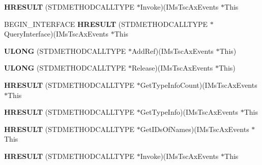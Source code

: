\begin{DoxyCompactItemize}
\item 
\mbox{\label{struct_i_ms_tsc_ax_events_vtbl_aa4c996f5b75ec11511423529ce78799d}} 
{\bfseries H\+R\+E\+S\+U\+LT} (S\+T\+D\+M\+E\+T\+H\+O\+D\+C\+A\+L\+L\+T\+Y\+PE $\ast$Invoke)(I\+Ms\+Tsc\+Ax\+Events $\ast$This
\item 
\mbox{\label{struct_i_ms_tsc_ax_events_vtbl_a735a32525d4f7fcb8f51600a5813d290}} 
B\+E\+G\+I\+N\+\_\+\+I\+N\+T\+E\+R\+F\+A\+CE {\bfseries H\+R\+E\+S\+U\+LT} (S\+T\+D\+M\+E\+T\+H\+O\+D\+C\+A\+L\+L\+T\+Y\+PE $\ast$Query\+Interface)(I\+Ms\+Tsc\+Ax\+Events $\ast$This
\item 
\mbox{\label{struct_i_ms_tsc_ax_events_vtbl_aa4ed551da38cabba93d5e6f91ca6ba16}} 
{\bfseries U\+L\+O\+NG} (S\+T\+D\+M\+E\+T\+H\+O\+D\+C\+A\+L\+L\+T\+Y\+PE $\ast$Add\+Ref)(I\+Ms\+Tsc\+Ax\+Events $\ast$This)
\item 
\mbox{\label{struct_i_ms_tsc_ax_events_vtbl_a607399f38e958c5f6b5b88daa78f4e45}} 
{\bfseries U\+L\+O\+NG} (S\+T\+D\+M\+E\+T\+H\+O\+D\+C\+A\+L\+L\+T\+Y\+PE $\ast$Release)(I\+Ms\+Tsc\+Ax\+Events $\ast$This)
\item 
\mbox{\label{struct_i_ms_tsc_ax_events_vtbl_a934e19afacb3f7ea608cb6a525ca27e2}} 
{\bfseries H\+R\+E\+S\+U\+LT} (S\+T\+D\+M\+E\+T\+H\+O\+D\+C\+A\+L\+L\+T\+Y\+PE $\ast$Get\+Type\+Info\+Count)(I\+Ms\+Tsc\+Ax\+Events $\ast$This
\item 
\mbox{\label{struct_i_ms_tsc_ax_events_vtbl_a8872ad7b15c39e654aee1142544dc9c4}} 
{\bfseries H\+R\+E\+S\+U\+LT} (S\+T\+D\+M\+E\+T\+H\+O\+D\+C\+A\+L\+L\+T\+Y\+PE $\ast$Get\+Type\+Info)(I\+Ms\+Tsc\+Ax\+Events $\ast$This
\item 
\mbox{\label{struct_i_ms_tsc_ax_events_vtbl_ad90b45c84cd591db5c21f229de2ae220}} 
{\bfseries H\+R\+E\+S\+U\+LT} (S\+T\+D\+M\+E\+T\+H\+O\+D\+C\+A\+L\+L\+T\+Y\+PE $\ast$Get\+I\+Ds\+Of\+Names)(I\+Ms\+Tsc\+Ax\+Events $\ast$This
\item 
\mbox{\label{struct_i_ms_tsc_ax_events_vtbl_aa4c996f5b75ec11511423529ce78799d}} 
{\bfseries H\+R\+E\+S\+U\+LT} (S\+T\+D\+M\+E\+T\+H\+O\+D\+C\+A\+L\+L\+T\+Y\+PE $\ast$Invoke)(I\+Ms\+Tsc\+Ax\+Events $\ast$This
\end{DoxyCompactItemize}
